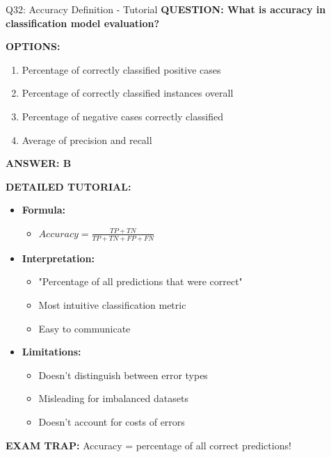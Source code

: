 \documentclass[8pt]{beamer}
\begin{document}
	\begin{frame}{Q32: Accuracy Definition - Tutorial}
		\fontsize{6.5}{7.5}\selectfont
		\textbf{QUESTION: What is accuracy in classification model evaluation?}
		
		\vspace{0.1cm}
		\textbf{OPTIONS:}
		\begin{enumerate}
			\item Percentage of correctly classified positive cases
			\item Percentage of correctly classified instances overall
			\item Percentage of negative cases correctly classified
			\item Average of precision and recall
		\end{enumerate}
		
		\vspace{0.1cm}
		\textcolor{myblue}{\textbf{ANSWER: B}}
		
		\vspace{0.1cm}
		\textbf{DETAILED TUTORIAL:}
		\begin{itemize}
			\item \textbf{Formula:}
			\begin{itemize}
				\item $Accuracy = \frac{TP + TN}{TP + TN + FP + FN}$
			\end{itemize}
			\item \textbf{Interpretation:}
			\begin{itemize}
				\item "Percentage of all predictions that were correct"
				\item Most intuitive classification metric
				\item Easy to communicate
			\end{itemize}
			\item \textbf{Limitations:}
			\begin{itemize}
				\item Doesn't distinguish between error types
				\item Misleading for imbalanced datasets
				\item Doesn't account for costs of errors
			\end{itemize}
		\end{itemize}
		
		\textcolor{myred}{\textbf{EXAM TRAP:}} Accuracy = \textcolor{myblue}{percentage of all correct predictions}!
	\end{frame}
	
\end{document}
